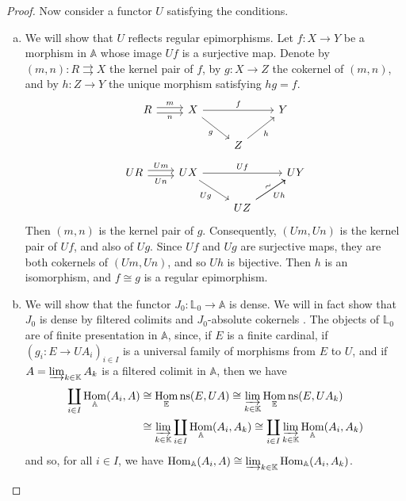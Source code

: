 \documentclass{article}
\newcommand{\bb}[1]{{\mathbb{#1}}}
\newcommand{\Set}{\mathbb{E}\mathrm{ns}}
\DeclareMathOperator{\Hom}{Hom}
\newcommand{\oldpage}[1]{\marginpar{\footnotesize$\Big\vert$ \textit{p.~#1}}}
\begin{document}
\begin{proof}
  Now consider a functor $U$ satisfying the conditions.
  \begin{enumerate}[a)]
    \item We will show that $U$ reflects regular epimorphisms.
      Let $f\colon X\to Y$ be a morphism in $\bb{A}$ whose image $Uf$ is a surjective map.
      Denote by $(m,n)\colon R\rightrightarrows X$ the kernel pair of $f$, by $g\colon X\to Z$ the cokernel of $(m,n)$, and by $h\colon Z\to Y$ the unique morphism satisfying $hg=f$.
      \[
        \begin{tikzcd}
          R \rar[shift left,"m"] \rar[shift right,swap,"n"]
          & X \ar[rr,"f"] \ar[dr,swap,"g"]
          && Y
        \\&& Z \ar[ur,swap,"h"]
        \end{tikzcd}
      \]
      \[
        \begin{tikzcd}
          UR \rar[shift left,"Um"] \rar[shift right,swap,"Un"]
          & UX \ar[rr,"Uf"] \ar[dr,swap,"Ug"]
          && UY
        \\&& UZ \ar[ur,swap,"Uh"] \ar[ur,sloped,"\sim"]
        \end{tikzcd}
      \]
      Then $(m,n)$ is the kernel pair of $g$.
      Consequently, $(Um,Un)$ is the kernel pair of $Uf$, and also of $Ug$.
      Since $Uf$ and $Ug$ are surjective maps, they are both cokernels of $(Um,Un)$, and so $Uh$ is bijective.
      Then $h$ is an isomorphism, and $f\cong g$ is a regular epimorphism.
\oldpage{202}
    \item We will show that the functor $J_0\colon\bb{L}_0\to\bb{A}$ is dense.
      We will in fact show that $J_0$ is dense by filtered colimits and $J_0$-absolute cokernels \cite{4}.
      The objects of $\bb{L}_0$ are of finite presentation in $\bb{A}$, since, if $E$ is a finite cardinal, if $(g_i\colon E\to UA_i)_{i\in I}$ is a universal family of morphisms from $E$ to $U$, and if $A=\varinjlim_{k\in\bb{K}}A_k$ is a filtered colimit in $\bb{A}$, then we have
      \[
        \begin{aligned}
          \coprod_{i\in I} \Hom_\bb{A}(A_i,A)
          &\cong \Hom_\Set(E,UA)
          \cong \varinjlim_{k\in\bb{K}} \Hom_\Set(E,UA_k)
        \\&\cong \varinjlim_{k\in\bb{K}} \coprod_{i\in I} \Hom_\bb{A}(A_i,A_k)
          \cong \coprod_{i\in I} \varinjlim_{k\in\bb{K}} \Hom_\bb{A}(A_i,A_k)
        \end{aligned}
      \]
      and so, for all $i\in I$, we have $\Hom_\bb{A}(A_i,A)\cong\varinjlim_{k\in\bb{K}}\Hom_\bb{A}(A_i,A_k)$.

\end{enumerate}
\end{proof}
\end{document}
